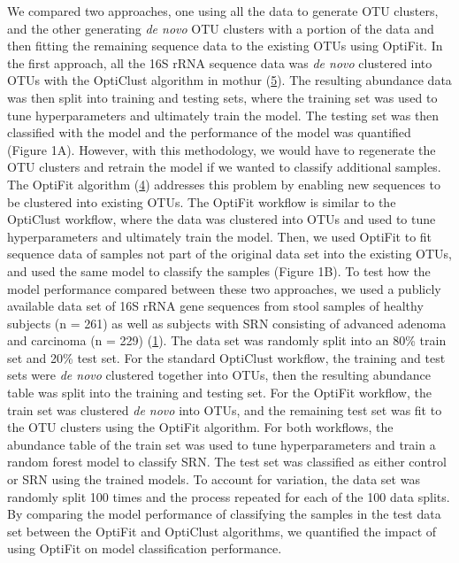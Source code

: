 \documentclass[
]{article}
\begin{document}
We compared two approaches, one using all the data to generate OTU
clusters, and the other generating \emph{de novo} OTU clusters with a
portion of the data and then fitting the remaining sequence data to the
existing OTUs using OptiFit. In the first approach, all the 16S rRNA
sequence data was \emph{de novo} clustered into OTUs with the OptiClust
algorithm in mothur (\protect\hyperlink{ref-westcott2017}{5}). The
resulting abundance data was then split into training and testing sets,
where the training set was used to tune hyperparameters and ultimately
train the model. The testing set was then classified with the model and
the performance of the model was quantified (Figure 1A). However, with
this methodology, we would have to regenerate the OTU clusters and
retrain the model if we wanted to classify additional samples. The
OptiFit algorithm (\protect\hyperlink{ref-sovacool2022}{4}) addresses
this problem by enabling new sequences to be clustered into existing
OTUs. The OptiFit workflow is similar to the OptiClust workflow, where
the data was clustered into OTUs and used to tune hyperparameters and
ultimately train the model. Then, we used OptiFit to fit sequence data
of samples not part of the original data set into the existing OTUs, and
used the same model to classify the samples (Figure 1B). To test how the
model performance compared between these two approaches, we used a
publicly available data set of 16S rRNA gene sequences from stool
samples of healthy subjects (n = 261) as well as subjects with SRN
consisting of advanced adenoma and carcinoma (n = 229)
(\protect\hyperlink{ref-baxter2016}{1}). The data set was randomly split
into an 80\% train set and 20\% test set. For the standard OptiClust
workflow, the training and test sets were \emph{de novo} clustered
together into OTUs, then the resulting abundance table was split into
the training and testing set. For the OptiFit workflow, the train set
was clustered \emph{de novo} into OTUs, and the remaining test set was
fit to the OTU clusters using the OptiFit algorithm. For both workflows,
the abundance table of the train set was used to tune hyperparameters
and train a random forest model to classify SRN. The test set was
classified as either control or SRN using the trained models. To account
for variation, the data set was randomly split 100 times and the process
repeated for each of the 100 data splits. By comparing the model
performance of classifying the samples in the test data set between the
OptiFit and OptiClust algorithms, we quantified the impact of using
OptiFit on model classification performance.
\end{document}
